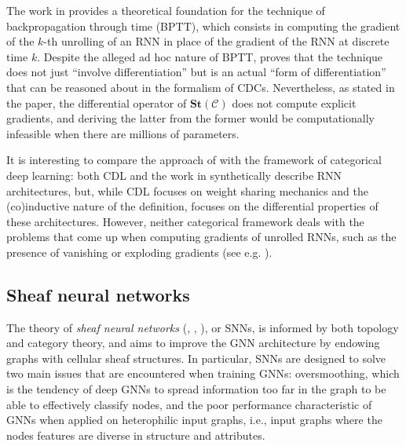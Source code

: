 \documentclass[11pt,a4paper,openright,twoside]{report}
\theoremstyle{plain}
\theoremstyle{definition}
\newcommand\dblquote[1]{\textquotedblleft #1\textquotedblright}
\begin{document}
The work in \cite{sprunger2019differentiable} provides a theoretical foundation for the technique of backpropagation through time (BPTT), which consists in computing the gradient of the $k$-th unrolling of an RNN in place of the gradient of the RNN at discrete time $k$. Despite the alleged ad hoc nature of BPTT, \cite{sprunger2019differentiable} proves that the technique does not just \dblquote{involve differentiation} but is an actual \dblquote{form of differentiation} that can be reasoned about in the formalism of CDCs. Nevertheless, as stated in the paper, the differential operator of $\mathbf{St}(\mathcal{C})$ does not compute explicit gradients, and deriving the latter from the former would be computationally infeasible when there are millions of parameters. 

It is interesting to compare the approach of \cite{sprunger2019differentiable} with the framework of categorical deep learning: both CDL and the work in \cite{sprunger2019differentiable} synthetically describe RNN architectures, but, while CDL focuses on weight sharing mechanics and the (co)inductive nature of the definition, \cite{sprunger2019differentiable} focuses on the differential properties of these architectures. However, neither categorical framework deals with the problems that come up when computing gradients of unrolled RNNs, such as the presence of vanishing or exploding gradients (see e.g. \cite{hanin2018neural}). 

\subsection{Sheaf neural networks}

The theory of \textit{sheaf neural networks} (\cite{hansen2020sheaf}, \cite{bodnar2022neural}, \cite{zaghen2024nonlinear}), or SNNs, is informed by both topology and category theory, and aims to improve the GNN architecture by endowing graphs with cellular sheaf structures. In particular, SNNs are designed to solve two main issues that are encountered when training GNNs: oversmoothing, which is the tendency of deep GNNs to spread information too far in the graph to be able to effectively classify nodes, and the poor performance characteristic of GNNs when applied on heterophilic input graphs, i.e., input graphs where the nodes features are diverse in structure and attributes.
\end{document}
